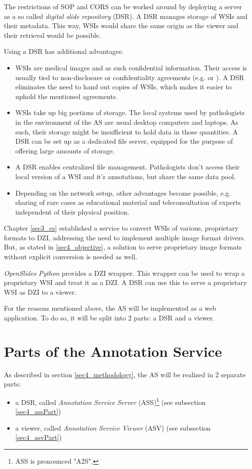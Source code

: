 The restrictions of SOP and CORS can be worked around by deploying a server as a so called \emph{digital slide repository} (DSR). A DSR manages storage of WSIs and their metadata\cite{Cornish13}. This way, WSIs would share the same origin as the viewer and their retrieval would be possible.

Using a DSR has additional advantages: 
\begin{itemize}
	\item WSIs are medical images and as such confidential information. Their access is usually tied to non-disclosure or confidentiality agreements (e.g. \cite{COA} or \cite{USSanDiego}). A DSR eliminates the need to hand out copies of WSIs, which makes it easier to uphold the mentioned agreements.
	\item WSIs take up big portions of storage\cite{Singh11}. The local systems used by pathologists in the environment of the AS are usual desktop computers and laptops. As such, their storage might be insufficient to hold data in those quantities. A DSR can be set up as a dedicated file server, equipped for the purpose of offering large amounts of storage.
	\item A DSR enables centralized file management. Pathologists don't access their local version of a WSI and it's annotations, but share the same data pool.
	\item Depending on the network setup, other advantages become possible, e.g. sharing of rare cases as educational material and teleconsultation of experts independent of their physical position\cite{Wilbur09}.
\end{itemize}

Chapter \ref{sec3_cs} established a service to convert WSIs of various, proprietary formats to DZI, addressing the need to implement multiple image format drivers. But, as stated in \ref{sec4_objective}, a solution to serve proprietary image formats without explicit conversion is needed as well.

\emph{OpenSlides Python} provides a DZI wrapper. This wrapper can be used to wrap a proprietary WSI and treat it as a DZI\cite{web:openslide}. A DSR can use this to serve a proprietary WSI as DZI to a viewer.

For the reasons mentioned above, the AS will be implemented as a web application. To do so, it will be split into 2 parts: a DSR and a viewer.

\clearpage
\section{Parts of the Annotation Service}
\label{sec4_parts}
As described in section \ref{sec4_methodology}, the AS will be realized in 2 separate parts:
\begin{itemize}
	\item a DSR, called \emph{Annotation Service Server} (ASS)\footnote{
		ASS is pronounced "A2S".
	} (see subsection \ref{sec4_assPart})
	\item a viewer, called \emph{Annotation Service Viewer} (ASV) (see subsection \ref{sec4_asvPart})
\end{itemize}

